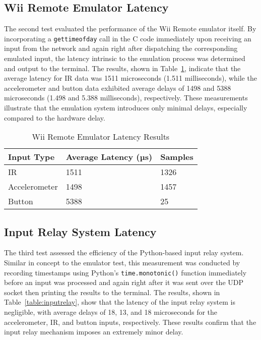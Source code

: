 \subsection{Wii Remote Emulator Latency}

The second test evaluated the performance of the Wii Remote emulator itself. By
incorporating a \texttt{gettimeofday} call in the C code immediately upon receiving an
input from the network and again right after dispatching the corresponding
emulated input, the latency intrinsic to the emulation process was determined and output to the terminal.
The results, shown in Table~\ref{table:emulator}, indicate that the average
latency for IR data was 1511 microseconds (1.511 milliseconds), while the
accelerometer and button data exhibited average delays of 1498 and 5388
microseconds (1.498 and 5.388 milliseconds), respectively. These measurements
illustrate that the emulation system introduces only minimal delays, especially compared to the hardware
delay.


\begin{table}[!ht]
    \centering
    \begin{tabular}{|l|l|l|}
    \hline
        Input Type & Average Latency (µs) & Samples \\ \hline
        IR & 1511 & 1326 \\ \hline
        Accelerometer & 1498 & 1457 \\ \hline
        Button & 5388 & 25 \\ \hline
    \end{tabular}
    \caption{Wii Remote Emulator Latency Results}
    \label{table:emulator}
\end{table}

\subsection{Input Relay System Latency}

The third test assessed the efficiency of the Python-based input relay
system. Similar in concept to the emulator test, this measurement was conducted
by recording timestamps using Python’s \texttt{time.monotonic()} function immediately
before an input was processed and again right after it was sent over the UDP
socket then printing the results to the terminal. The results, shown in
Table~\ref{table:inputrelay}, show that the latency of the input relay system is
negligible, with average delays of 18, 13, and 18 microseconds for the
accelerometer, IR, and button inputs, respectively. These results confirm that the input
relay mechanism imposes an extremely minor delay.

